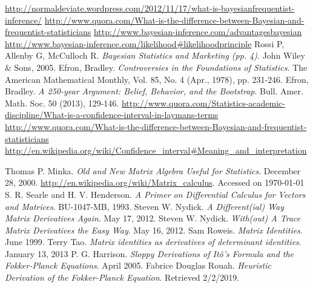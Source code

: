 \documentclass{book}
\begin{document}
\begin{thebibliography}{100}
 {\url{http://normaldeviate.wordpress.com/2012/11/17/what-is-bayesianfrequentist-inference/}}
 {\url{http://www.quora.com/What-is-the-difference-between-Bayesian-and-frequentist-statisticians}}
 {\url{http://www.bayesian-inference.com/advantagesbayesian}}
 {\url{http://www.bayesian-inference.com/likelihood#likelihoodprinciple}}
 Rossi P, Allenby G, McCulloch R. {\emph{Bayesian Statistics and Marketing (pp. 4)}}. John Wiley \& Sons, 2005.
 Efron, Bradley. {\emph{Controversies in the Foundations of Statistics}}. The American Mathematical Monthly, Vol. 85, No. 4 (Apr., 1978), pp. 231-246.
 Efron, Bradley. {\emph{A 250-year Argument: Belief, Behavior, and the Bootstrap}}. Bull. Amer. Math. Soc. 50 (2013), 129-146.
 {\url{http://www.quora.com/Statistics-academic-discipline/What-is-a-confidence-interval-in-laymans-terms}}
 {\url{http://www.quora.com/What-is-the-difference-between-Bayesian-and-frequentist-statisticians}}
 {\url{http://en.wikipedia.org/wiki/Confidence_interval#Meaning_and_interpretation}}

 Thomas P. Minka. {\em{Old and New Matrix Algebra Useful for Statistics}}. December 28, 2000.
 \url{http://en.wikipedia.org/wiki/Matrix_calculus}. Accessed on \today
{} S. R. Searle and H. V. Henderson. {\em{A Primer on Differential Calculus for Vectors and Matrices}}. BU-1047-MB, 1993.
 Steven W. Nydick. {\em{A Different(ial) Way Matrix Derivatives Again}}. May 17, 2012.
 Steven W. Nydick. {\em{With(out) A Trace Matrix Derivatives the Easy Way}}. May 16, 2012.
 Sam Roweis. {\em{Matrix Identities}}. June 1999.
 Terry Tao. {\em{Matrix identities as derivatives of determinant identities}}. January 13, 2013
 P. G. Harrison. {\em{Sloppy Derivations of It\^o's Formula and the Fokker-Planck Equations}}. April 2005.
 Fabrice Douglas Rouah. {\em{Heuristic Derivation of the Fokker-Planck Equation}}. Retrieved 2/2/2019.
\end{thebibliography}

\printindex
\end{document}
